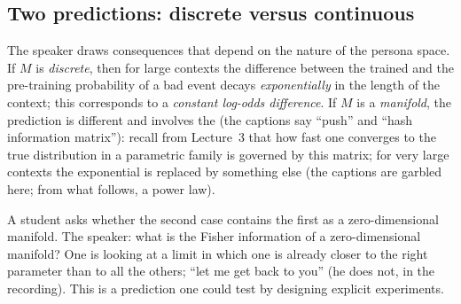 \subsection{Two predictions: discrete versus continuous}\label{sec:L7-pred}
The speaker draws consequences that depend on the nature of the persona space. If $M$ is \emph{discrete}, then for large contexts the difference between the trained and the pre-training probability of a bad event decays \emph{exponentially} in the length of the context; this corresponds to a \emph{constant log-odds difference}. If $M$ is a \emph{manifold}, the prediction is different and involves the  (the captions say ``push'' and ``hash information matrix''): recall from Lecture~3 that how fast one converges to the true distribution in a parametric family is governed by this matrix; for very large contexts the exponential is replaced by something else (the captions are garbled here; from what follows, a power law\flag).

A student asks whether the second case contains the first as a zero-dimensional manifold. The speaker: what is the Fisher information of a zero-dimensional manifold? One is looking at a limit in which one is already closer to the right parameter than to all the others; ``let me get back to you'' (he does not, in the recording). This is a prediction one could test by designing explicit experiments.

